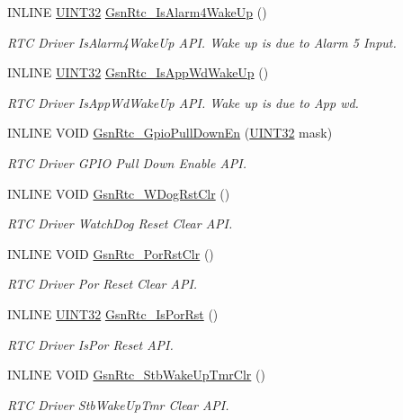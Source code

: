 \begin{DoxyCompactItemize}
INLINE \hyperlink{a00660_gae1e6edbbc26d6fbc71a90190d0266018}{UINT32} \hyperlink{a00651_ga8b0b40139b7b358a239851f0f4784a3d}{GsnRtc\_\-IsAlarm4WakeUp} ()
\begin{DoxyCompactList}\small\item\em RTC Driver IsAlarm4WakeUp API. Wake up is due to Alarm 5 Input. \end{DoxyCompactList}\item 
INLINE \hyperlink{a00660_gae1e6edbbc26d6fbc71a90190d0266018}{UINT32} \hyperlink{a00651_gaf64956b6c0d9bad7a2af010b0f5fbf15}{GsnRtc\_\-IsAppWdWakeUp} ()
\begin{DoxyCompactList}\small\item\em RTC Driver IsAppWdWakeUp API. Wake up is due to App wd. \end{DoxyCompactList}\item 
INLINE VOID \hyperlink{a00651_ga4562094b52ee5ba2c4eda48dc602929f}{GsnRtc\_\-GpioPullDownEn} (\hyperlink{a00660_gae1e6edbbc26d6fbc71a90190d0266018}{UINT32} mask)
\begin{DoxyCompactList}\small\item\em RTC Driver GPIO Pull Down Enable API. \end{DoxyCompactList}\item 
INLINE VOID \hyperlink{a00651_ga5c7e28c93ba1d286490bf3fa8286022b}{GsnRtc\_\-WDogRstClr} ()
\begin{DoxyCompactList}\small\item\em RTC Driver WatchDog Reset Clear API. \end{DoxyCompactList}\item 
INLINE VOID \hyperlink{a00651_ga34f15d48bb91c7bbad8388e7e88195b1}{GsnRtc\_\-PorRstClr} ()
\begin{DoxyCompactList}\small\item\em RTC Driver Por Reset Clear API. \end{DoxyCompactList}\item 
INLINE \hyperlink{a00660_gae1e6edbbc26d6fbc71a90190d0266018}{UINT32} \hyperlink{a00651_gae89e16f4b3c227c10f40a7ad9bf7f37a}{GsnRtc\_\-IsPorRst} ()
\begin{DoxyCompactList}\small\item\em RTC Driver IsPor Reset API. \end{DoxyCompactList}\item 
INLINE VOID \hyperlink{a00651_ga2813f8a6b6eb71b15d51405f92c9e65a}{GsnRtc\_\-StbWakeUpTmrClr} ()
\begin{DoxyCompactList}\small\item\em RTC Driver StbWakeUpTmr Clear API. \end{DoxyCompactList}\item 

\end{DoxyCompactItemize}
